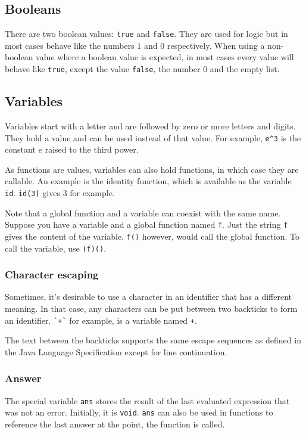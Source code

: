 \documentclass[10pt]{article}
\begin{document}
    \subsection{Booleans}\label{subsec:booleans}
    There are two boolean values: \verb|true| and \verb|false|.
    They are used for logic but in most cases behave like the numbers $ 1 $ and $ 0 $ respectively.
    When using a non-boolean value where a boolean value is expected, in most cases every value will behave like \verb|true|, except the value \verb|false|, the number $ 0 $ and the empty list.
    
    \subsection{Variables}\label{subsec:variables}
    Variables start with a letter and are followed by zero or more letters and digits.
    They hold a value and can be used instead of that value.
    For example, \verb|e^3| is the constant $ e $ raised to the third power.
    
    As functions are values, variables can also hold functions, in which case they are callable.
    An example is the identity function, which is available as the variable \verb|id|.
    \verb|id(3)| gives $ 3 $ for example.
    
    Note that a global function and a variable can coexist with the same name.
    Suppose you have a variable and a global function named \verb|f|.
    Just the string \verb|f| gives the content of the variable.
    \verb|f()| however, would call the global function.
    To call the variable, use \verb|(f)()|.
    
    \subsubsection{Character escaping}
    Sometimes, it's desirable to use a character in an identifier that has a different meaning.
    In that case, any characters can be put between two backticks to form an identifier.
    \verb|`+`| for example, is a variable named \verb|+|.

    The text between the backticks supports the same escape sequences as defined in the Java Language Specification except for line continuation.
    
    \subsubsection{Answer}
    The special variable \verb|ans| stores the result of the last evaluated expression that was not an error.
    Initially, it is \verb|void|.
    \verb|ans| can also be used in functions to reference the last answer at the point, the function is called.
    
\end{document}
